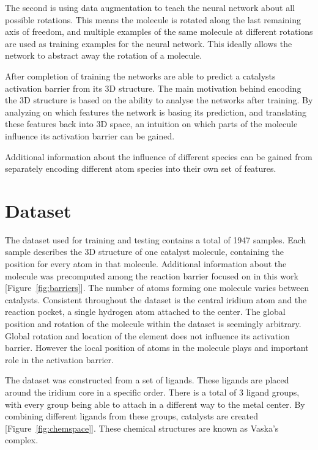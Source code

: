 The second is using data augmentation to teach the neural network about all possible rotations.
This means the molecule is rotated along the last remaining axis of freedom, and multiple examples of the same molecule at different rotations are used as training examples for the neural network.
This ideally allows the network to abstract away the rotation of a molecule.

After completion of training the networks are able to predict a catalysts activation barrier from its 3D structure.
The main motivation behind encoding the 3D structure is based on the ability to analyse the networks after training.
By analyzing on which features the network is basing its prediction, and translating these features back into 
3D space, an intuition on which parts of the molecule influence its activation barrier can be gained.

Additional information about the influence of different species can be gained 
from separately encoding different atom species into their own set of features.

\section{Dataset}

The dataset used for training and testing contains a total of 1947 samples.
Each sample describes the 3D structure of one catalyst molecule, 
containing the position for every atom in that molecule.
Additional information about the molecule was precomputed among the reaction barrier focused on in this work [Figure~\ref{fig:barriers}].
The number of atoms forming one molecule varies between catalysts.
Consistent throughout the dataset is the central iridium atom and the reaction pocket, a single hydrogen atom attached to the center.
The global position and rotation of the molecule within the dataset is seemingly arbitrary.
Global rotation and location of the element does not influence its activation barrier.
However the local position of atoms in the molecule plays and important role in the activation barrier.


The dataset was constructed from a set of ligands.
These ligands are placed around the iridium core in a specific order.
There is a total of 3 ligand groups, with every group being able to attach in a different way to the metal center.
By combining different ligands from these groups, catalysts are created [Figure~\ref{fig:chemspace}].
These chemical structures are known as Vaska's complex.

